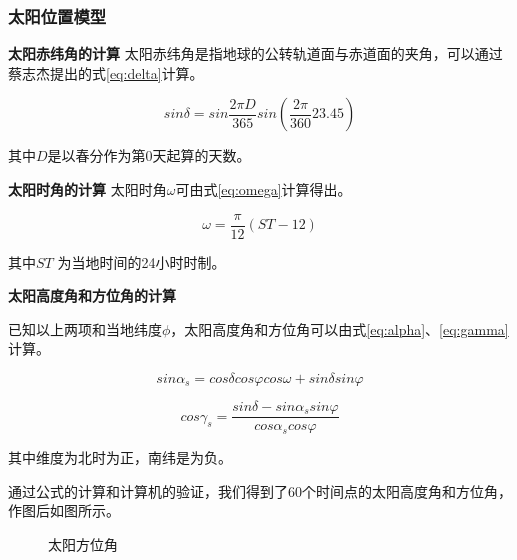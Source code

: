 \documentclass[withoutpreface,bwprint]{cumcmthesis} %
\begin{document}
\subsubsection{太阳位置模型}

\textbf{太阳赤纬角的计算} \space 太阳赤纬角是指地球的公转轨道面与赤道面的夹角，可以通过蔡志杰提出的式\ref{eq:delta}计算。

\begin{equation}
    sin\delta=sin\frac{2\pi D}{365}sin(\frac{2\pi}{360}23.45) \label{eq:delta}
\end{equation}

其中$D$是以春分作为第0天起算的天数。

\textbf{太阳时角的计算} \space 太阳时角$\omega$可由式\ref{eq:omega}计算得出。

\begin{equation}
    \omega=\frac{\pi}{12}(ST-12) \label{eq:omega}
\end{equation}

其中$ST$ 为当地时间的24小时时制。

\textbf{太阳高度角和方位角的计算}

已知以上两项和当地纬度$\phi$，太阳高度角和方位角可以由式\ref{eq:alpha}、\ref{eq:gamma}计算。

\begin{equation}
    sin\alpha_{s} = cos\delta cos\varphi cos\omega + sin\delta sin\varphi \label{eq:alpha}
\end{equation}

\begin{equation}
    cos\gamma_{s}=\frac{sin\delta-sin\alpha_{s}sin\varphi}{cos\alpha_{s}cos\varphi} \label{eq:gamma}
\end{equation}

其中维度为北时为正，南纬是为负。

通过公式的计算和计算机的验证，我们得到了60个时间点的太阳高度角和方位角，作图后如图所示。

\begin{figure}
    \centering
    \caption{太阳方位角}
\end{figure}
\end{document}

